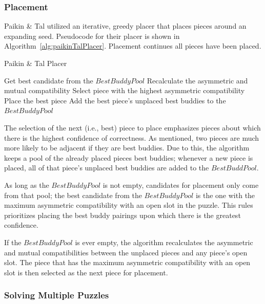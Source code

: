 \documentclass{report}
\begin{document}
\subsubsection{Placement}\label{sec:paikinTalPlacer}

Paikin \& Tal utilized an iterative, greedy placer that places pieces around an expanding seed.  Pseudocode for their placer is shown in Algorithm~\ref{alg:paikinTalPlacer}.  Placement continues all pieces have been placed.

\begin{algorithm}
\caption{Paikin \& Tal Placer}\label{alg:paikinTalPlacer}
\begin{algorithmic}[1]

      \State Get best candidate from the $BestBuddyPool$
   \Else
      \State Recalculate the asymmetric and mutual compatibility
      \State Select piece with the highest asymmetric compatibility
   \EndIf  
   \State Place the best piece
   \State Add the best piece's unplaced best buddies to the $BestBuddyPool$

\EndWhile
\end{algorithmic}
\end{algorithm}

The selection of the next (i.e., best) piece to place emphasizes pieces about which there is the highest confidence of correctness. As mentioned, two pieces are much more likely to be adjacent if they are best buddies.  Due to this, the algorithm keeps a pool of the already placed pieces best buddies; whenever a new piece is placed, all of that piece's unplaced best buddies are added to the $BestBuddPool$.  

As long as the $BestBuddyPool$ is not empty, candidates for placement only come from that pool; the best candidate from the $BestBuddyPool$ is the one with the maximum asymmetric compatibility with an open slot in the puzzle.  This rules prioritizes placing the best buddy pairings upon which there is the greatest confidence.

If the $BestBuddyPool$ is ever empty, the algorithm recalculates the asymmetric and mutual compatibilities between the unplaced pieces and any piece's open slot.  The piece that has the maximum asymmetric compatibility with an open slot is then selected as the next piece for placement.

\subsubsection{Solving Multiple Puzzles}\label{sec:paikinTalSolvingMultiplePuzzles}
\end{document}
